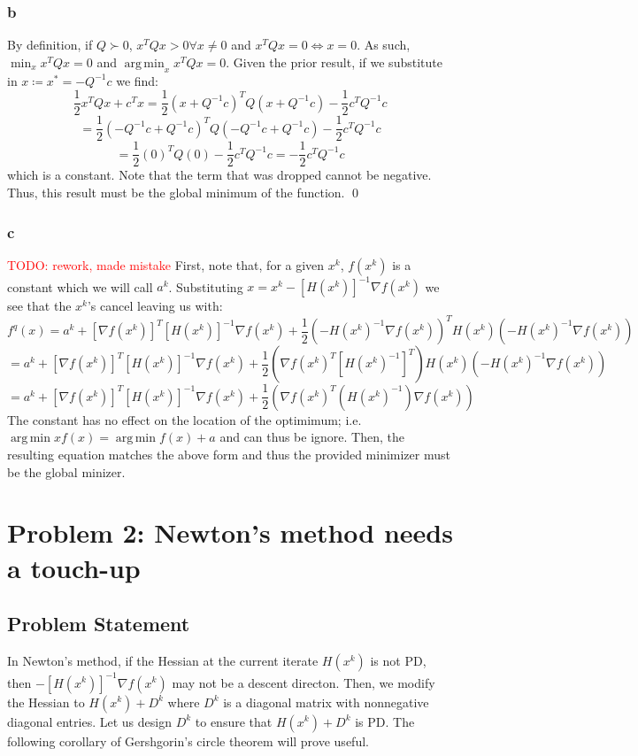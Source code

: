 \documentclass[11pt]{report}
\theoremstyle{definition}
\DeclareMathOperator*{\argmin}{arg\,min}
\begin{document}
\subsubsection*{b}
By definition, if $Q\succ0$, $x^TQx>0\forall x\neq 0$ and $x^TQx=0\iff x=0$.
As such, $\min_x x^TQx = 0$ and $\argmin_x x^TQx = 0$.
Given the prior result, if we substitute in $x\coloneqq x^*=-Q^{-1}c$ we find:
\[
	\frac{1}{2}x^TQx+c^Tx
	= \frac{1}{2}(x+Q^{-1}c)^TQ(x+Q^{-1}c)-\frac{1}{2}c^TQ^{-1}c
\]
\[
	= \frac{1}{2}(-Q^{-1}c+Q^{-1}c)^TQ(-Q^{-1}c+Q^{-1}c)-\frac{1}{2}c^TQ^{-1}c
\]
\[
	= \frac{1}{2}(0)^TQ(0)-\frac{1}{2}c^TQ^{-1}c
	= -\frac{1}{2}c^TQ^{-1}c
\]
which is a constant. Note that the term that was dropped cannot be negative. Thus, this
result must be the global minimum of the function.
\qed
\subsubsection*{c}
\textcolor{red}{TODO: rework, made  mistake}
First, note that, for a given $x^k$, $f(x^k)$ is a constant which we will call $a^k$.
Substituting $x = x^k-[H(x^k)]^{-1}\nabla f(x^k)$ we see that the $x^k$'s cancel leaving
us with:
\[
	f^q(x) = a^k+[\nabla f(x^k)]^T[H(x^k)]^{-1}\nabla f(x^k) +
	\frac{1}{2}(-H(x^k)^{-1}\nabla f(x^k))^T
	H(x^k)
	(-H(x^k)^{-1}\nabla f(x^k))
\]
\[
	= a^k+[\nabla f(x^k)]^T[H(x^k)]^{-1}\nabla f(x^k) +
	\frac{1}{2}(\nabla f(x^k)^T[H(x^k)^{-1}]^T)
	H(x^k)
	(-H(x^k)^{-1}\nabla f(x^k))
\]
\[
	= a^k+[\nabla f(x^k)]^T[H(x^k)]^{-1}\nabla f(x^k) +
	\frac{1}{2}(\nabla f(x^k)^T
	(H(x^k)^{-1})\nabla f(x^k))
\]
The constant has no effect on the location of the optimimum; i.e. $\argmin{x} f(x) = \argmin f(x)+a$
and can thus be ignore. Then, the resulting equation matches the above form and thus the
provided minimizer must be the global minizer.


\section*{Problem 2: Newton's method needs a touch-up}
\subsection*{Problem Statement}
In Newton's method, if the Hessian at the current iterate $H(x^k)$ is not PD,
then $-[H(x^k)]^{-1}\nabla f(x^k)$ may not be a descent directon. Then, we modify the Hessian to
$H(x^k)+D^k$ where $D^k$ is a diagonal matrix with nonnegative diagonal entries. Let us design
$D^k$ to ensure that $H(x^k)+D^k$ is PD. The following corollary of Gershgorin's circle theorem
will prove useful.
\end{document}
